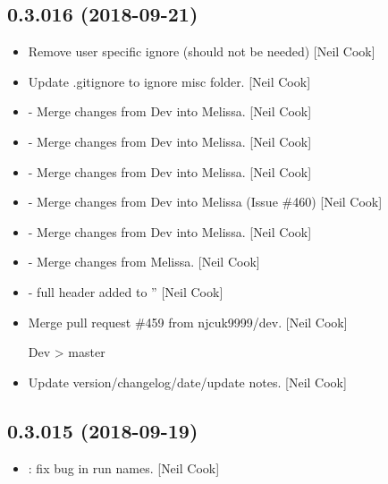 \documentclass[a4paper,10pt,english]{report}
\begin{document}
\subsection{0.3.016 (2018-09-21)}
\label{\detokenize{misc/changelog:id316}}\begin{itemize}
\item {} 
Remove user specific ignore (should not be needed) {[}Neil Cook{]}

\item {} 
Update .gitignore to ignore misc folder. {[}Neil Cook{]}

\item {} 
 - Merge changes from Dev into Melissa. {[}Neil Cook{]}

\item {} 
 - Merge changes from Dev into Melissa. {[}Neil Cook{]}

\item {} 
 - Merge changes from Dev into Melissa. {[}Neil Cook{]}

\item {} 
 - Merge changes from Dev into Melissa (Issue \#460) {[}Neil
Cook{]}

\item {} 
 - Merge changes from Dev into Melissa. {[}Neil
Cook{]}

\item {} 
 - Merge changes from Melissa. {[}Neil Cook{]}

\item {} 
 - full header added to ” {[}Neil
Cook{]}

\item {} 
Merge pull request \#459 from njcuk9999/dev. {[}Neil Cook{]}

Dev \textendash{}\textgreater{} master

\item {} 
Update version/changelog/date/update notes. {[}Neil Cook{]}

\end{itemize}


\subsection{0.3.015 (2018-09-19)}
\label{\detokenize{misc/changelog:id317}}\begin{itemize}
\item {} 
: fix bug in run names. {[}Neil Cook{]}

\end{itemize}
\end{document}
